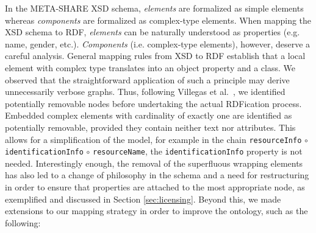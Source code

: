 \documentclass{llncs}
\begin{document}
In the META-SHARE XSD schema, \emph{elements} are formalized as simple elements
whereas \emph{components} are formalized as complex-type elements. When mapping
the XSD schema to RDF, \emph{elements} can be naturally understood as properties
(e.g. name, gender, etc.). \emph{Components} (i.e. complex-type elements),
however, deserve a careful analysis. General mapping rules from XSD to RDF
establish that a local element with complex type translates into an object
property and a class. We observed that the straightforward application of such a
principle may derive unnecessarily verbose graphs. Thus,
following Villegas et al.~\cite{Villegas2014}, we identified potentially removable nodes before
undertaking the actual RDFication process. Embedded complex elements with
cardinality of exactly one are identified as potentially removable, provided they contain
neither text nor attributes. This allows for a simplification of the model, for
example in the chain {\tt resourceInfo} $\circ$ {\tt identificationInfo}
$\circ$ {\tt resourceName}, the {\tt identificationInfo} property is not needed.
Interestingly enough, the removal of the superfluous wrapping elements has also
led to a change of philosophy in the schema and a need for restructuring in order to ensure that properties are attached to the most appropriate node, as exemplified and discussed in Section \ref{sec:licensing}.
Beyond this, we made extensions to our mapping strategy in order to improve the ontology, such as the following:
\end{document}
